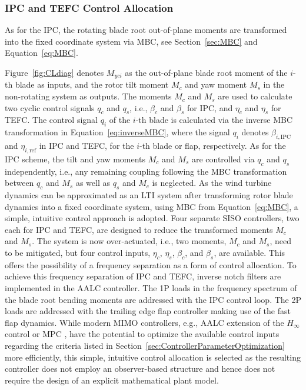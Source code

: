 
\subsubsection*{IPC and TEFC Control Allocation}
As for the IPC, the rotating blade root out-of-plane moments are transformed into the fixed coordinate system via MBC, see Section~\ref{sec:MBC} and Equation~\eqref{eq:MBC}.

Figure~\ref{fig:CLdiag} denotes $M_{yci}$ as the out-of-plane blade root moment of the $i$-th blade as inputs, and the rotor tilt moment $M_c$ and yaw moment $M_s$ in the non-rotating system as outputs. The moments $M_c$ and $M_s$ are used to calculate two cyclic control signals $q_c$ and $q_s$, i.e., $\beta_c$ and $\beta_s$ for IPC, and $\eta_c$ and $\eta_s$ for TEFC. The control signal $q_i$ of the $i$-th blade is calculated via the inverse MBC transformation in Equation~\eqref{eq:inverseMBC},
where the signal $q_i$ denotes $\beta_{i,\text{IPC}}$ and $\eta_{i,\text{ref}}$ in IPC and TEFC, for the $i$-th blade or flap, respectively. As for the IPC scheme, the tilt and yaw moments $M_c$ and $M_s$ are controlled via $q_c$ and $q_s$ independently, i.e., any remaining coupling following the MBC transformation between $q_c$ and $M_s$ as well as $q_s$ and $M_c$ is neglected. As the wind turbine dynamics can be approximated as an LTI system after transforming rotor blade dynamics into a fixed coordinate system, using MBC from Equation~\eqref{eq:MBC}, a simple, intuitive control approach is adopted. Four separate SISO controllers, two each for IPC and TEFC, are designed to reduce the transformed moments $M_c$ and $M_s$. The system is now over-actuated, i.e., two moments, $M_c$ and $M_s$, need to be mitigated, but four control inputs, $\eta_c$, $\eta_s$, $\beta_c$, and $\beta_s$, are available. This offers the possibility of a frequency separation as a form of control allocation. To achieve this frequency separation of IPC and TEFC, inverse notch filters are implemented in the AALC controller. The 1P loads in the frequency spectrum of the blade root bending moments are addressed with the IPC control loop. The 2P loads are addressed with the trailing edge flap controller making use of the fast flap dynamics. While modern MIMO controllers, e.g., AALC extension of the $H_\infty$ control \cite{ossmann2021field,ossmann2017load} or MPC \cite{dittmer2021velocity}, have the potential to optimize the available control inputs regarding the criteria listed in Section~\ref{sec:ControllerParameterOptimization} more efficiently, this simple, intuitive control allocation is selected as the resulting controller does not employ an observer-based structure and hence does not require the design of an explicit mathematical plant model.%


